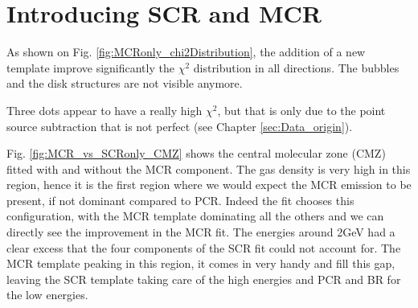\section{Introducing SCR and MCR}


As shown on Fig. \ref{fig:MCRonly_chi2Distribution}, the addition of a new template improve significantly the $\chi^2$ distribution in all directions. The bubbles and the disk structures are not visible anymore.

Three dots appear to have a really high $\chi^2$, but that is only due to the point source subtraction that is not perfect (see Chapter \ref{sec:Data_origin}).

%  

Fig. \ref{fig:MCR_vs_SCRonly_CMZ} shows the central molecular zone (CMZ) fitted with and without the MCR component. The gas density is very high in this region, hence it is the first region where we would expect the MCR emission to be present, if not dominant compared to PCR. Indeed the fit chooses this configuration, with the MCR template dominating all the others and we can directly see the improvement in the MCR fit. The energies around 2GeV had a clear excess that the four components of the SCR fit could not account for. The MCR template peaking in this region, it comes in very handy and fill this gap, leaving the SCR template taking care of the high energies and PCR and BR for the low energies. 


